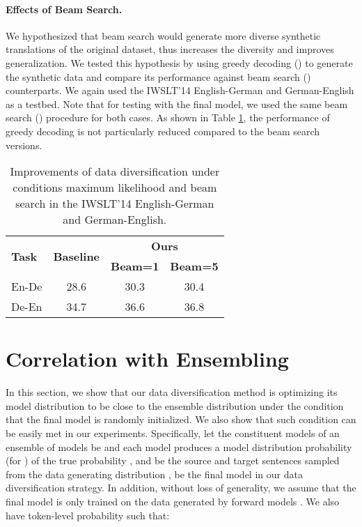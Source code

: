 \documentclass{article}
\begin{document}
\paragraph{Effects of Beam Search.} 
We hypothesized that beam search would generate more diverse synthetic translations of the original dataset, thus increases the diversity and improves generalization. We tested this hypothesis by using greedy decoding () to generate the synthetic data and compare its performance against beam search () counterparts. We again used the IWSLT'14 English-German and German-English as a testbed. Note that for testing with the final model, we used the same beam search () procedure for both cases. As shown in Table \ref{table:effect_beam}, the performance of greedy decoding is not particularly reduced compared to the beam search versions.

\begin{table}[t]
\begin{center}
\caption{Improvements of data diversification under conditions maximum likelihood and beam search in the IWSLT'14 English-German and German-English.}
\begin{tabular}{lccc}
\toprule
\multirow{2}{*}{\bf Task}   & \multirow{2}{*}{\bf Baseline} & \multicolumn{2}{c}{\bf Ours}\\
\cmidrule{3-4}
{\bf }                  & {\bf }    & {\bf Beam=1}    & {\bf Beam=5}\\
\midrule
En-De	& 28.6	& 30.3	& 30.4\\
De-En	& 34.7	& 36.6	& 36.8\\
\bottomrule
\end{tabular}
\label{table:effect_beam}
\end{center}
\end{table}



\section{Correlation with Ensembling}\label{app:proof}
In this section, we show that our data diversification method is optimizing its model distribution to be close to the ensemble distribution under the condition that the final model is randomly initialized. We also show that such condition can be easily met in our experiments. Specifically, let the constituent models of an ensemble of models be  and each model  produces a model distribution probability  (for ) of the true probability ,  and  be the source and target sentences sampled from the data generating distribution ,  be the final model in our data diversification strategy. 
In addition, without loss of generality, we assume that the final model  is only trained on the data generated by forward models . 
We also have token-level probability  such that:
\end{document}
